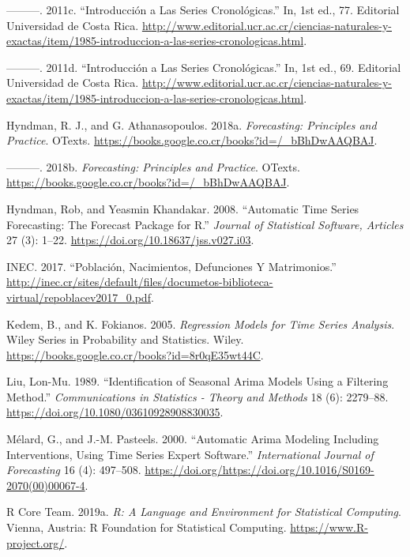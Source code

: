\documentclass[]{article}
\begin{document}
\leavevmode\hypertarget{ref-oscarh-3}{}%
---------. 2011c. ``Introducción a Las Series Cronológicas.'' In, 1st
ed., 77. Editorial Universidad de Costa Rica.
\url{http://www.editorial.ucr.ac.cr/ciencias-naturales-y-exactas/item/1985-introduccion-a-las-series-cronologicas.html}.

\leavevmode\hypertarget{ref-oscarh-4}{}%
---------. 2011d. ``Introducción a Las Series Cronológicas.'' In, 1st
ed., 69. Editorial Universidad de Costa Rica.
\url{http://www.editorial.ucr.ac.cr/ciencias-naturales-y-exactas/item/1985-introduccion-a-las-series-cronologicas.html}.

\leavevmode\hypertarget{ref-hyndman2018forecasting}{}%
Hyndman, R. J., and G. Athanasopoulos. 2018a. \emph{Forecasting:
Principles and Practice}. OTexts.
\url{https://books.google.co.cr/books?id=/_bBhDwAAQBAJ}.

\leavevmode\hypertarget{ref-hyndman_box-jenkins}{}%
---------. 2018b. \emph{Forecasting: Principles and Practice}. OTexts.
\url{https://books.google.co.cr/books?id=/_bBhDwAAQBAJ}.

\leavevmode\hypertarget{ref-auto.arima}{}%
Hyndman, Rob, and Yeasmin Khandakar. 2008. ``Automatic Time Series
Forecasting: The Forecast Package for R.'' \emph{Journal of Statistical
Software, Articles} 27 (3): 1--22.
\url{https://doi.org/10.18637/jss.v027.i03}.

\leavevmode\hypertarget{ref-calidad_vitales}{}%
INEC. 2017. ``Población, Nacimientos, Defunciones Y Matrimonios.''
\url{http://inec.cr/sites/default/files/documetos-biblioteca-virtual/repoblacev2017_0.pdf}.

\leavevmode\hypertarget{ref-kedem}{}%
Kedem, B., and K. Fokianos. 2005. \emph{Regression Models for Time
Series Analysis}. Wiley Series in Probability and Statistics. Wiley.
\url{https://books.google.co.cr/books?id=8r0qE35wt44C}.

\leavevmode\hypertarget{ref-liu}{}%
Liu, Lon-Mu. 1989. ``Identification of Seasonal Arima Models Using a
Filtering Method.'' \emph{Communications in Statistics - Theory and
Methods} 18 (6): 2279--88.
\url{https://doi.org/10.1080/03610928908830035}.

\leavevmode\hypertarget{ref-melard}{}%
Mélard, G., and J.-M. Pasteels. 2000. ``Automatic Arima Modeling
Including Interventions, Using Time Series Expert Software.''
\emph{International Journal of Forecasting} 16 (4): 497--508.
\url{https://doi.org/https://doi.org/10.1016/S0169-2070(00)00067-4}.

\leavevmode\hypertarget{ref-Rbase}{}%
R Core Team. 2019a. \emph{R: A Language and Environment for Statistical
Computing}. Vienna, Austria: R Foundation for Statistical Computing.
\url{https://www.R-project.org/}.
\end{document}
